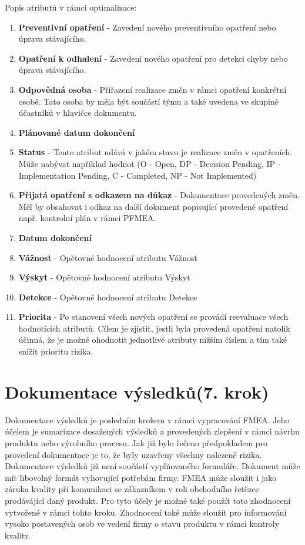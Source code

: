 \newpage
Popis atributů v rámci optimalizace:
\begin{enumerate}
	\item \textbf{Preventivní opatření} - Zavedení nového preventivního opatření nebo úprava stávajícího.
	\item \textbf{Opatření k odhalení} - Zavedení nového opatření pro detekci chyby nebo úprava stávajícího.
	\item \textbf{Odpovědná osoba} - Přiřazení realizace změn v rámci opatření konkrétní osobě. Tato osoba by měla být součástí týmu a také uvedena ve skupině účastníků v hlavičce dokumentu.
	\item \textbf{Plánované datum dokončení}
	\item \textbf{Status} - Tento atribut udává v jakém stavu je realizace změn v opatřeních. Může nabývat například hodnot (O - Open, DP - Decision Pending, IP - Implementation Pending, C - Completed, NP - Not Implemented)
	\item \textbf{Přijatá opatření s odkazem na důkaz} - Dokumentace provedených změn. Měl by obsahovat i odkaz na další dokument popisující provedené opatření např. kontrolní plán v rámci PFMEA.
	\item \textbf{Datum dokončení} 
	\item \textbf{Vážnost} - Opětovné hodnocení atributu Vážnost
	\item \textbf{Výskyt} - Opětovné hodnocení atributu Výskyt
	\item \textbf{Detekce} - Opětovné hodnocení atributu Detekce
	\item \textbf{Priorita} - Po stanovení všech nových opatření se provádí reevaluace všech hodnotících atributů. Cílem je zjistit, jestli byla provedená opatření natolik účinná, že je možné ohodnotit jednotlivé atributy  nižším číslem a tím také snížit prioritu rizika. 
\end{enumerate}

\section{Dokumentace výsledků(7. krok)}
Dokumentace výsledků je posledním krokem v rámci vypracování FMEA. Jeho účelem je sumarizace dosažených výsledků a provedených zlepšení v rámci návrhu produktu nebo výrobního procesu. Jak již bylo řečeno předpokladem pro provedení dokumentace je to, že byly uzavřeny všechny nalezené rizika. Dokumentace výsledků již není součástí vyplňovaného formuláře. Dokument může mít libovolný formát vyhovující potřebám firmy. FMEA může sloužit i jako záruka kvality při komunikaci se zákazníkem v roli obchodního řetězce prodávájící daný produkt. Pro tyto účely je možné také použít toto zhodnocení vytvořené v rámci tohto kroku. Zhodnocení také může sloužit pro informování vysoko postavených osob ve vedení firmy o stavu produktu v rámci kontroly kvality. 
  